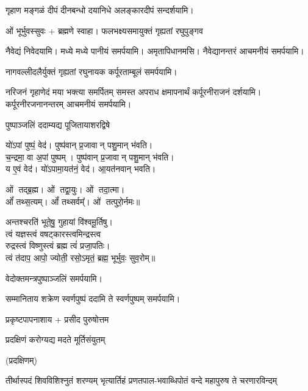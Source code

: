 {गृहाण मङ्गळं दीपं दीनबन्धो दयानिधे}
\devAya{} अलङ्कारदीपं सन्दर्शयामि।

ओं भूर्भुवस्सुवः + ब्रह्मणे स्वाहा।
{फलभक्ष्यसमायुक्तं गृह्यतां रघुपुङ्गव}

\devAya{} नैवेद्यं निवेदयामि। मध्ये
मध्ये पानीयं समर्पयामि। अमृतापिधानमसि। नैवेद्यानन्तरं आचमनीयं समर्पयामि।


{नागवल्लीदलैर्युक्तं गृह्यतां रघुनायक}
\devAya{} कर्पूरताम्बूलं समर्पयामि।


{नरिजनं गृहाणेदं मया भक्त्या समर्पितम्}
\devAya{} समस्त अपराध क्षमापनार्थं कर्पूरनीराजनं दर्शयामि। कर्पूरनीरजनानन्तरम् आचमनीयं समर्पयामि।

{पुष्पाञ्जलिं ददाम्यद्य पूजितायाशरद्विषे}

यो॑ऽपां पुष्पं॒ वेद॑। पुष्प॑वान् प्र॒जावान् पशु॒मान् भ॑वति।\\
च॒न्द्रमा॒ वा अ॒पां पुष्पम्। पुष्प॑वान् प्र॒जावान् पशु॒मान् भ॑वति।\\
य ए॒वं वेद॑। यो॑ऽपामा॒यत॑नं॒ वेद॑। आ॒यत॑नवान् भवति।\medskip

ओं तद्ब्र॒ह्म। ओं तद्वा॒युः। ओं तदा॒त्मा।\\ ओं᳚ तथ्स॒त्यम्‌।
ओं᳚ तथ्सर्वम्᳚‌। ओं तत्पुरो॒र्नमः॥\medskip

अन्तश्चरति॑ भूते॒षु॒ गुहायां वि॑श्वमू॒र्तिषु। \\
त्वं यज्ञस्त्वं वषट्कारस्त्वमिन्द्रस्त्व\\ रुद्रस्त्वं विष्णुस्त्वं ब्रह्म त्वं॑ प्रजा॒पतिः। \\
त्वं त॑दाप॒ आपो॒ ज्योती॒ रसो॒ऽमृतं॒ ब्रह्म॒ भूर्भुवः॒ सुव॒रोम्‌॥

\devAya{} वेदोक्तमन्त्रपुष्पाञ्जलिं समर्पयामि।

{सम्मानिताय शक्रेण स्वर्णपुष्पं ददामि ते}
स्वर्णपुष्पम् समर्पयामि।

{प्रकृष्टपापनाशाय + प्रसीद पुरुषोत्तम}

{प्रदक्षिणं करोग्यद्य मदते मूर्तिसंयुतम्}

\hfill (प्रदक्षिणम्)

{तीर्थास्पदं शिवविशिश्नुतं शरण्यम्}
{भृत्यार्तिहं प्रणतपाल-भवाब्धिपोतं}
{वन्दे महापुरुष ते चरणारविन्दम्}



